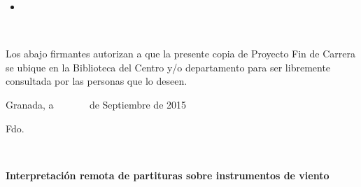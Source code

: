 \begin{itemize}
	\item [] 
\end{itemize}


\newpage


\newpage
\thispagestyle{empty}

\cleardoublepage
\thispagestyle{empty}
{}



\newpage
\thispagestyle{empty}
\noindent

\newpage
\thispagestyle{empty}

~

\cleardoublepage
{}
\thispagestyle{empty}


\noindent Los abajo firmantes autorizan a que la presente copia de
Proyecto Fin de Carrera se ubique en la Biblioteca del Centro y/o
departamento para ser libremente consultada por las personas que lo
deseen.

\vspace*{1cm}

\begin{center}
Granada, a ~~~~~~ de Septiembre de 2015
\par\end{center}

\bigskip%
\bigskip%
\begin{doublespace}
\hspace{4cm}Fdo.
\end{doublespace}

\newpage
\thispagestyle{empty}

~

\cleardoublepage
{}
\thispagestyle{empty}

\begin{center}
\textbf{\Large Interpretación remota de partituras sobre instrumentos de viento}
\par\end{center}{\Large \par}

